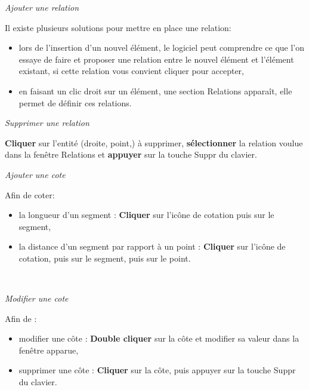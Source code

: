 \textit{Ajouter une relation}

Il existe plusieurs solutions pour mettre en place une relation:
\begin{itemize}
 \item lors de l'insertion d'un nouvel élément, le logiciel peut \og comprendre \fg ce que l'on essaye de faire et proposer une relation entre le nouvel élément et l'élément existant, si cette relation vous convient cliquer pour accepter,
 \item en faisant un clic droit sur un élément, une section \og Relations \fg apparaît, elle permet de définir ces relations.
\end{itemize}

\textit{Supprimer une relation}

\textbf{Cliquer} sur l'entité (droite, point,) à supprimer, \textbf{sélectionner} la relation voulue dans la fenêtre Relations et \textbf{appuyer} sur la touche Suppr du clavier.

\textit{Ajouter une cote}

Afin de coter:
\begin{itemize}
 \item la longueur d'un segment : \textbf{Cliquer} sur l'icône de cotation puis sur le segment,
 \item la distance d'un segment par rapport à un point : \textbf{Cliquer} sur l'icône de cotation, puis sur le segment, puis sur le point.
\end{itemize}

~\

\textit{Modifier une cote}

Afin de :
\begin{itemize}
 \item modifier une côte : \textbf{Double cliquer} sur la côte et modifier sa valeur dans la fenêtre apparue,
 \item supprimer une côte : \textbf{Cliquer} sur la côte, puis appuyer sur la touche Suppr du clavier.
\end{itemize}



